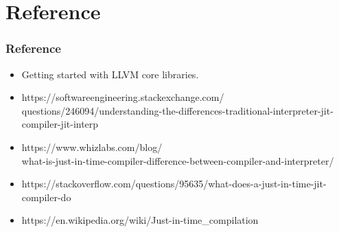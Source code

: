 \documentclass{beamer}
\begin{document}
\section{Reference}
\begin{frame}
\frametitle{Reference}
\begin{itemize}
	\item Getting started with LLVM core libraries.
	\item https://softwareengineering.stackexchange.com/\\questions/246094/understanding-the-differences-traditional-interpreter-jit-compiler-jit-interp
	\item https://www.whizlabs.com/blog/\\what-is-just-in-time-compiler-difference-between-compiler-and-interpreter/
	\item https://stackoverflow.com/questions/95635/what-does-a-just-in-time-jit-compiler-do
	\item https://en.wikipedia.org/wiki/Just-in-time\_compilation
\end{itemize}
\end{frame}
\end{document}
